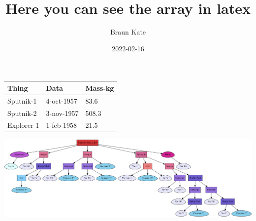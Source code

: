 \documentclass{article}
\title{Here you can see the array in latex}
\author{Braun Kate}
\date{2022-02-16}
\begin{document}
\maketitle

\begin{tabular}{| l | l | l |}\hline
Thing & Data & Mass-kg \\ \hline
Sputnik-1 & 4-oct-1957 & 83.6 \\ \hline
Sputnik-2 & 3-nov-1957 & 508.3 \\ \hline
Explorer-1 & 1-feb-1958 & 21.5 \\
\hline
\end{tabular}
\begin{center}\includegraphics[scale=0.22]{artifacts/AstTree.png}
\end{center}
\end{document}
